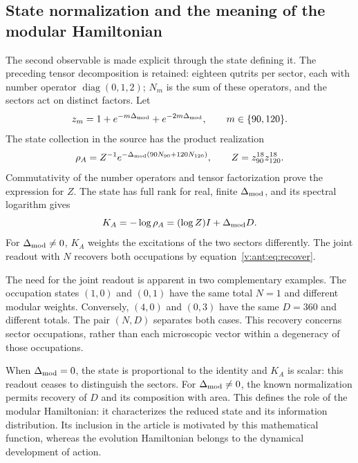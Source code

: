 \subsection{State normalization and the meaning of the modular Hamiltonian}
The second observable is made explicit through the state defining it.
The preceding tensor decomposition is retained: eighteen qutrits
per sector, each with number operator $\operatorname{diag}(0,1,2)$;
$N_m$ is the sum of these operators, and the sectors act on distinct
factors. Let
\[
 z_m=1+e^{-m\Delta_{\rm mod}}+e^{-2m\Delta_{\rm mod}},
 \qquad m\in\{90,120\}.
\]
The state collection in the source has the product realization
\[
 \rho_A=Z^{-1}e^{-\Delta_{\rm mod}(90N_{90}+120N_{120})},
 \qquad Z=z_{90}^{18}z_{120}^{18}.
\]
Commutativity of the number operators and tensor factorization
prove the expression for $Z$. The state has full rank for
real, finite $\Delta_{\rm mod}$, and its spectral logarithm gives
\[
 K_A=-\log\rho_A=(\log Z)I+\Delta_{\rm mod}D.
\]
For $\Delta_{\rm mod}\ne0$, $K_A$ weights the excitations of the two
sectors differently. The joint readout with $N$ recovers both occupations
by equation~\eqref{v:ant:eq:recover}.

The need for the joint readout is apparent in two complementary examples.
The occupation states $(1,0)$ and $(0,1)$ have the same total $N=1$
and different modular weights. Conversely, $(4,0)$ and $(0,3)$ have
the same $D=360$ and different totals. The pair $(N,D)$ separates both
cases. This recovery concerns sector occupations, rather than
each microscopic vector within a degeneracy of those occupations.

When $\Delta_{\rm mod}=0$, the state is proportional to the identity
and $K_A$ is scalar: this readout ceases to distinguish the sectors.
For $\Delta_{\rm mod}\ne0$, the known normalization permits recovery of
$D$ and its composition with area. This defines the role of the modular
Hamiltonian: it characterizes the reduced state and its information distribution.
Its inclusion in the article is motivated by this mathematical function,
whereas the evolution Hamiltonian belongs to the dynamical development
of action.
